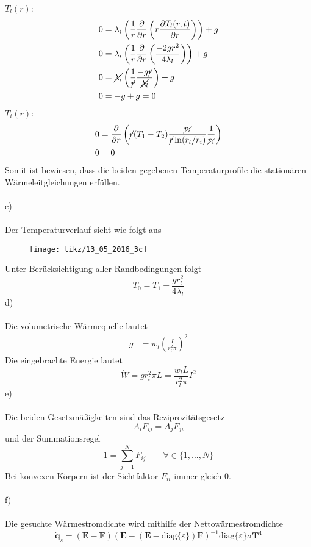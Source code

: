$T_l(r)$:
\begin{align*}
	0 &= \lambda_i\left( \frac{1}{r}\frac{\partial }{\partial r}\left( r\frac{\partial T_l(r,t)}{\partial r}\right)\right) + g \\
	0 &= \lambda_i\left( \frac{1}{r}\frac{\partial }{\partial r}\left(\frac{-2gr^2}{4\lambda_l}\right)\right) + g \\
	0 &= \cancel{\lambda_i}\left( \frac{1}{\cancel{r}}\frac{-g\cancel{r}}{\cancel{\lambda_l}}\right) + g\\
	0 &= -g + g = 0
\end{align*}
$T_i(r)$:
\begin{align*}
	0 &= \frac{\partial }{\partial r}\left( \cancel{r} (T_1 - T_2)\frac{\cancel{r_i}}{\cancel{r}\ln(r_l/r_i)}\frac{1}{\cancel{r_i}}\right) \\
	0 &= 0
\end{align*}
Somit ist bewiesen, dass die beiden gegebenen Temperaturprofile die stationären Wärmeleitgleichungen erfüllen. \\ \\
c)\\ \\
Der Temperaturverlauf sieht wie folgt aus
\begin{figure}[h]
	\centering
	\texttt{[image: tikz/13\_05\_2016\_3c]}
\end{figure}
\newline
Unter Berücksichtigung aller Randbedingungen folgt
\[
	T_0 = T_1 + \frac{gr_l^2}{4\lambda_l}
\]
d)\\ \\
Die volumetrische Wärmequelle lautet
\begin{align*}
	g &=  w_l\left(\frac{I}{r_l^2\pi}\right)^2
\end{align*}
Die eingebrachte Energie lautet
\[
	\dot{W} = gr_l^2\pi L = \frac{w_l L}{r_l^2\pi}I^2
\]
e)\\ \\
Die beiden Gesetzmäßigkeiten sind das Reziprozitätsgesetz
\[
	A_iF_{ij} = A_jF_{ji}
\]
und der Summationsregel
\[
	1 = \sum_{j=1}^{N} F_{ij} \qquad \forall \in \{ 1, ... , N\}
\]
Bei konvexen Körpern ist der Sichtfaktor $F_{ii}$ immer gleich 0. \\ \\
f)\\ \\
Die gesuchte Wärmestromdichte wird mithilfe der Nettowärmestromdichte
\[
	\dot{\textbf{q}}_s = (\textbf{E} - \textbf{F})(\textbf{E} - (\textbf{E} - \text{diag}\{\varepsilon\})\textbf{F})^{-1}\text{diag}\{\varepsilon\}\sigma\textbf{T}^4
\]
